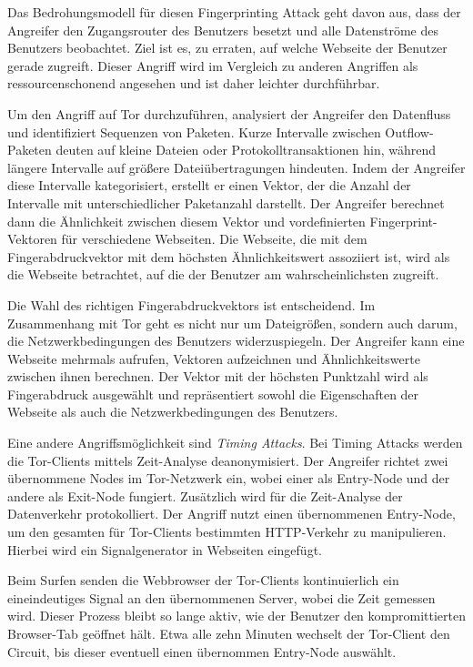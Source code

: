 Das Bedrohungsmodell für diesen Fingerprinting Attack geht davon aus, dass der Angreifer den Zugangsrouter des Benutzers besetzt und alle Datenströme des Benutzers beobachtet. Ziel ist es, zu erraten, auf welche Webseite der Benutzer gerade zugreift. Dieser Angriff wird im Vergleich zu anderen Angriffen als ressourcenschonend angesehen und ist daher leichter durchführbar.

Um den Angriff auf Tor durchzuführen, analysiert der Angreifer den Datenfluss und identifiziert Sequenzen von Paketen. Kurze Intervalle zwischen Outflow-Paketen deuten auf kleine Dateien oder Protokolltransaktionen hin, während längere Intervalle auf größere Dateiübertragungen hindeuten. Indem der Angreifer diese Intervalle kategorisiert, erstellt er einen Vektor, der die Anzahl der Intervalle mit unterschiedlicher Paketanzahl darstellt. Der Angreifer berechnet dann die Ähnlichkeit zwischen diesem Vektor und vordefinierten Fingerprint-Vektoren für verschiedene Webseiten. Die Webseite, die mit dem Fingerabdruckvektor mit dem höchsten Ähnlichkeitswert assoziiert ist, wird als die Webseite betrachtet, auf die der Benutzer am wahrscheinlichsten zugreift\cite{AttackInTor}.

Die Wahl des richtigen Fingerabdruckvektors ist entscheidend. Im Zusammenhang mit Tor geht es nicht nur um Dateigrößen, sondern auch darum, die Netzwerkbedingungen des Benutzers widerzuspiegeln. Der Angreifer kann eine Webseite mehrmals aufrufen, Vektoren aufzeichnen und Ähnlichkeitswerte zwischen ihnen berechnen. Der Vektor mit der höchsten Punktzahl wird als Fingerabdruck ausgewählt und repräsentiert sowohl die Eigenschaften der Webseite als auch die Netzwerkbedingungen des Benutzers\cite{FingerprintingOnTorAttack}.

Eine andere Angriffsmöglichkeit sind \textit{Timing Attacks}. Bei Timing Attacks werden die Tor-Clients mittels Zeit-Analyse deanonymisiert. Der Angreifer richtet zwei übernommene Nodes im Tor-Netzwerk ein, wobei einer als Entry-Node und der andere als Exit-Node fungiert. Zusätzlich wird für die Zeit-Analyse der Datenverkehr protokolliert. Der Angriff nutzt einen übernommenen Entry-Node, um den gesamten für Tor-Clients bestimmten HTTP-Verkehr zu manipulieren. Hierbei wird ein Signalgenerator in Webseiten eingefügt.

Beim Surfen senden die Webbrowser der Tor-Clients kontinuierlich ein eineindeutiges Signal an den übernommenen Server, wobei die Zeit gemessen wird. Dieser Prozess bleibt so lange aktiv, wie der Benutzer den kompromittierten Browser-Tab geöffnet hält. Etwa alle zehn Minuten wechselt der Tor-Client den Circuit, bis dieser eventuell einen übernommen Entry-Node auswählt.

